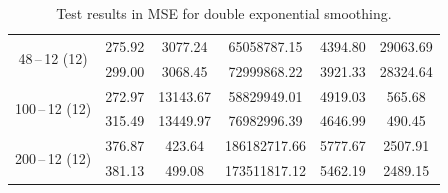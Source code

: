 \begin{table}[h]
\begin{center}
\begin{tabular}{c|c|c|c|c|c}
                \multirow{2}{*}{48\,--\,12 (12)}  & 275.92 & 3077.24 & 65058787.15 & 4394.80 & 29063.69 \\
                                                  & 299.00 & 3068.45 & 72999868.22 & 3921.33 & 28324.64 \\ \hline
                \multirow{2}{*}{100\,--\,12 (12)} & 272.97 & 13143.67 & 58829949.01 & 4919.03 & 565.68 \\
                                                  & 315.49 & 13449.97 & 76982996.39 & 4646.99 & 490.45 \\ \hline
                \multirow{2}{*}{200\,--\,12 (12)} & 376.87 & 423.64 & 186182717.66 & 5777.67 & 2507.91 \\
                                                  & 381.13 & 499.08 & 173511817.12 & 5462.19 & 2489.15 \\ \hline
            \end{tabular}
            \caption{Test results in MSE for double exponential smoothing.}
            \label{appen:tab:double-results}
        \end{center}
    \end{table}

